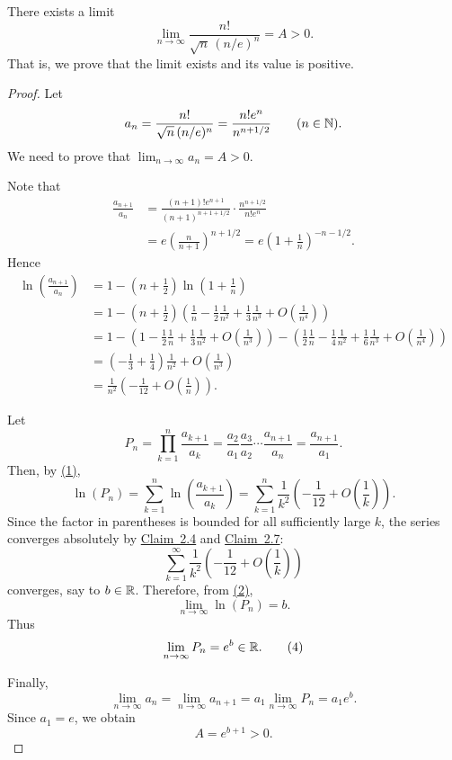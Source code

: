 \begin{claim}\label{claim:4.6}
There exists a limit
\[
\lim_{n\to\infty}\frac{n!}{\sqrt n\,(n/e)^n}=A>0.
\]
That is, we prove that the limit exists and its value is positive.
\end{claim}

\begin{proof}
Let
\[
a_n=\frac{n!}{\sqrt n\,(n/e)^n}
=\frac{n!e^n}{n^{n+1/2}}
\qquad(n\in\mathbb{N}).
\]
We need to prove that $\lim_{n\to\infty}a_n=A>0$.

Note that
\begin{align*}
\frac{a_{n+1}}{a_n}
&=\frac{(n+1)!e^{n+1}}{(n+1)^{n+1+1/2}}
\cdot\frac{n^{n+1/2}}{n!e^n}\\
&=e\left(\frac{n}{n+1}\right)^{n+1/2}
=e\left(1+\frac1n\right)^{-n-1/2}.
\end{align*}
Hence
\begin{align*}
\ln\left(\frac{a_{n+1}}{a_n}\right)
&=1-\left(n+\frac12\right)\ln\left(1+\frac1n\right)\\
&=1-\left(n+\frac12\right)
\left(
\frac1n-\frac12\frac1{n^2}+\frac13\frac1{n^3}+O\left(\frac1{n^4}\right)
\right)\\
&=1-
\left(1-\frac12\frac1n+\frac13\frac1{n^2}+O\left(\frac1{n^3}\right)\right)
-
\left(\frac12\frac1n-\frac14\frac1{n^2}+\frac16\frac1{n^3}+O\left(\frac1{n^4}\right)\right)\\
&=\left(-\frac13+\frac14\right)\frac1{n^2}
+O\left(\frac1{n^3}\right)\\
&=\frac1{n^2}\left(-\frac1{12}+O\left(\frac1n\right)\right).
\tag{1}\label{eq:4:1:1}
\end{align*}

Let
\[
P_n=\prod_{k=1}^{n}\frac{a_{k+1}}{a_k}
=\frac{a_2}{a_1}\frac{a_3}{a_2}\cdots\frac{a_{n+1}}{a_n}
=\frac{a_{n+1}}{a_1}.
\tag{3}\label{eq:4:3:1}
\]
Then, by \hyperref[eq:4:1:1]{(1)},
\[
\ln(P_n)
=\sum_{k=1}^{n}\ln\left(\frac{a_{k+1}}{a_k}\right)
=\sum_{k=1}^{n}\frac1{k^2}\left(-\frac1{12}+O\left(\frac1k\right)\right).
\tag{2}\label{eq:4:2:1}
\]
Since the factor in parentheses is bounded for all sufficiently large $k$, the series converges absolutely by \hyperref[claim:2.4]{Claim~2.4} and \hyperref[claim:2.7]{Claim~2.7}:
\[
\sum_{k=1}^{\infty}\frac1{k^2}\left(-\frac1{12}+O\left(\frac1k\right)\right)
\]
converges, say to $b\in\mathbb{R}$. Therefore, from \hyperref[eq:4:2:1]{(2)},
\[
\lim_{n\to\infty}\ln(P_n)=b.
\]
Thus
\[
\lim_{n\to\infty}P_n=e^b\in\mathbb{R}.
\tag{4}\label{eq:4:4:1}
\]

Finally,
\[
\lim_{n\to\infty}a_n
=\lim_{n\to\infty}a_{n+1}
=a_1\lim_{n\to\infty}P_n
=a_1e^b.
\]
Since $a_1=e$, we obtain
\[
A=e^{b+1}>0.
\]
\end{proof}

